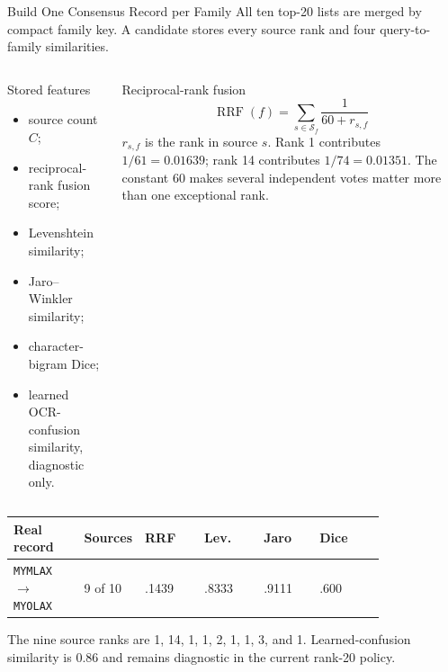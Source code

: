 \documentclass[aspectratio=169,10pt]{beamer}
\newcommand{\code}[1]{\texttt{#1}}
\begin{document}
\begin{frame}{Build One Consensus Record per Family}
\scriptsize
All ten top-20 lists are merged by compact family key. A candidate stores every
source rank and four query-to-family similarities.

\begin{columns}[T,onlytextwidth]
\begin{block}{Stored features}
\begin{itemize}
  \item source count $C$;
  \item reciprocal-rank fusion score;
  \item Levenshtein similarity;
  \item Jaro--Winkler similarity;
  \item character-bigram Dice;
  \item learned OCR-confusion similarity, diagnostic only.
\end{itemize}
\end{block}

\begin{block}{Reciprocal-rank fusion}
\[
\operatorname{RRF}(f)=
\sum_{s\in\mathcal{S}_f}\frac{1}{60+r_{s,f}}
\]
$r_{s,f}$ is the rank in source $s$. Rank 1 contributes $1/61=0.01639$;
rank 14 contributes $1/74=0.01351$. The constant 60 makes several independent
votes matter more than one exceptional rank.
\end{block}
\end{columns}

\vspace{1mm}
\begin{tabularx}{\linewidth}{@{}L{0.19\linewidth}L{0.16\linewidth}L{0.16\linewidth}L{0.16\linewidth}L{0.15\linewidth}Y@{}}
\toprule
\textbf{Real record} & \textbf{Sources} & \textbf{RRF} & \textbf{Lev.} & \textbf{Jaro} & \textbf{Dice} \\
\midrule
\code{MYMLAX}$\rightarrow$\code{MYOLAX} & 9 of 10 & .1439 & .8333 & .9111 & .600 \\
\bottomrule
\end{tabularx}
The nine source ranks are 1, 14, 1, 1, 2, 1, 1, 3, and 1. Learned-confusion
similarity is 0.86 and remains diagnostic in the current rank-20 policy.
\end{frame}
\end{document}
